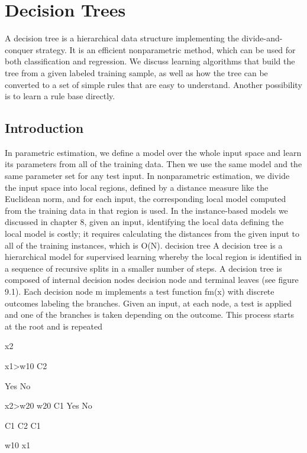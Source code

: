 \chapter{Decision Trees}
\label{chap:09-decision-trees}

A decision tree is a hierarchical data structure implementing the divide-and-conquer strategy. It is an efficient nonparametric method, which can be used for both classification and regression. We discuss learning algorithms that build the tree from a given labeled training sample, as well as how the tree can be converted to a set of simple rules that are easy to understand. Another possibility is to learn a rule base directly.

\section{Introduction}

In parametric estimation, we define a model over the whole input space and learn its parameters from all of the training data. Then we use the same model and the same parameter set for any test input. In nonparametric estimation, we divide the input space into local regions, defined by a distance measure like the Euclidean norm, and for each input, the corresponding local model computed from the training data in that region is used. In the instance-based models we discussed in chapter 8, given an input, identifying the local data defining the local model is costly; it requires calculating the distances from the given input to all of the training instances, which is O(N). decision tree A decision tree is a hierarchical model for supervised learning whereby the local region is identified in a sequence of recursive splits in a smaller number of steps. A decision tree is composed of internal decision nodes decision node and terminal leaves (see figure 9.1). Each decision node m implements a test function fm(x) with discrete outcomes labeling the branches. Given an input, at each node, a test is applied and one of the branches is taken depending on the outcome. This process starts at the root and is repeated

x2

x1>w10 C2

Yes No

x2>w20 w20 C1 Yes No

C1 C2 C1

w10 x1

